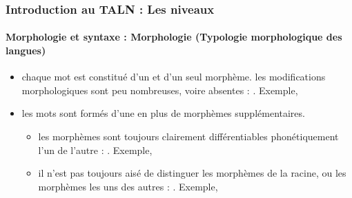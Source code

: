 \documentclass[xcolor=table]{beamer}
\begin{document}
\begin{frame}
\frametitle{Introduction au TALN : Les niveaux}
\framesubtitle{Morphologie et syntaxe : Morphologie (Typologie morphologique des langues)}

\begin{itemize}
	\item {} chaque mot est constitué d'un et d'un seul morphème. les modifications morphologiques sont peu nombreuses, voire absentes : . Exemple, 
	\item {} les mots sont formés d'une  en plus de morphèmes supplémentaires.
	\begin{itemize}
		\item {} les morphèmes sont toujours clairement différentiables phonétiquement l'un de l'autre : . Exemple,  
		\item {} il n'est pas toujours aisé de distinguer les morphèmes de la racine, ou les morphèmes les uns des autres : . Exemple, 
	\end{itemize}
\end{itemize}

\end{frame}
\end{document}
